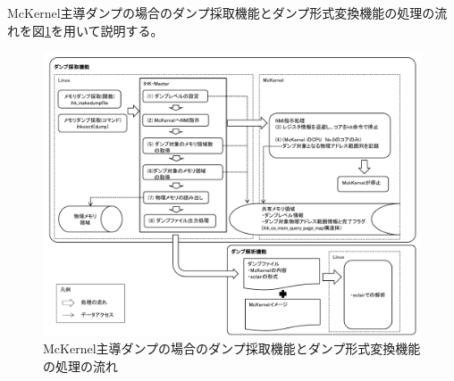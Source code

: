 \documentclass[twoside,11pt,fleqn]{book}
\begin{document}
\subsection{}
McKernel主導ダンプの場合のダンプ採取機能とダンプ形式変換機能の処理の流れを図\ref{figure:chap01_fig006}を用いて説明する。
\begin{figure}[!ht]
  \includegraphics[scale=0.6]{figs/chap01_fig006.pdf}
  \caption{McKernel主導ダンプの場合のダンプ採取機能とダンプ形式変換機能の処理の流れ}
  \label{figure:chap01_fig006}
\end{figure} 
\FloatBarrier
%
\end{document}
